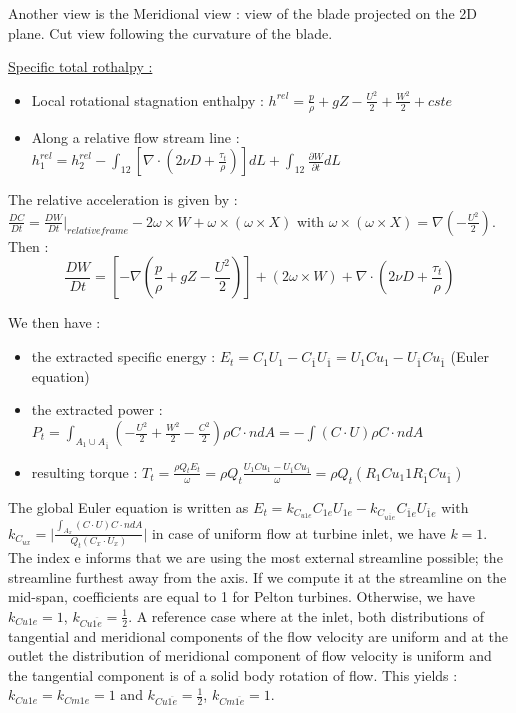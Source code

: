 \documentclass[../main.tex]{subfiles}
\begin{document}
Another view is the Meridional view : view of the blade projected on the 2D plane. Cut view following the curvature of the blade.

\quad \underline{Specific total rothalpy :}\\
\begin{itemize}
    \item Local rotational stagnation enthalpy : $h^{rel} = \frac{p}{\rho} + gZ - \frac{U^2}{2} + \frac{W^2}{2}+cste$
    \item Along a relative flow stream line : $h_1^{rel} = h_2^{rel} - \int_{12} [\nabla \cdot (2 \nu D + \frac{\tau_t}{\rho}) ]dL + \int_{12} \frac{\partial W}{\partial t}dL$
\end{itemize}

The relative acceleration is given by : $\frac{DC}{Dt} = \frac{DW}{Dt}\rvert_{relative frame} - 2\omega \times W + \omega \times (\omega \times X)$ with $\omega \times (\omega \times X) = \nabla (-\frac{U^2}{2})$. Then : \begin{equation}
    \frac{DW}{Dt} = [-\nabla (\frac{p}{\rho} + gZ - \frac{U^2}{2})] + (2\omega \times W) + \nabla \cdot (2\nu D + \frac{\tau_t}{\rho})
\end{equation}

We then have : \begin{itemize}
    \item the extracted specific energy : $E_t = C_1 U_1 - C_{\overline{1}} U_{\overline{1}} = U_1 Cu_1 - U_{\overline{1}} Cu_{\overline{1}}$ (Euler equation)
    \item the extracted power : $P_t = \int_{A_1 \cup A_{\overline{1}}} (-\frac{U^2}{2} + \frac{W^2}{2} - \frac{C^2}{2}) \rho C\cdot n dA = -\int (C\cdot U) \rho C\cdot n dA$
    \item resulting torque : $T_t = \frac{\rho Q_t E_t}{\omega} = \rho Q_t \frac{U_1 Cu_1 - U_{\overline{1}} Cu_{\overline{1}}}{\omega} = \rho Q_t (R_1 Cu_1 1 R_{\overline{1}} Cu_{\overline{1}})$
\end{itemize}

The global Euler equation is written as $E_t = k_{C_{u1e}} C_{1e} U_{1e} - k_{C_{u\overline{1}e}} C_{\overline{1}e} U_{\overline{1}e}$ with $k_{C_{ux}} = \lvert \frac{\int_{A_x} (C\cdot U) C \cdot n dA}{Q_t (C_x \cdot U_x)}\rvert$ in case of uniform flow at turbine inlet, we have $k = 1$. The index e informs that we are using the most external streamline possible; the streamline furthest away from the axis. If we compute it at the streamline on the mid-span, coefficients are equal to 1 for Pelton turbines. Otherwise, we have $k_{Cu1e} = 1$, $k_{Cu\overline{1e}} = \frac{1}{2}$. A reference case where at the inlet, both distributions of tangential and meridional components of the flow velocity are uniform and at the outlet the distribution of meridional component of flow velocity is uniform and the tangential component is of a solid body rotation of flow. This yields : $k_{Cu1e} = k_{Cm1e} = 1$ and $k_{Cu\overline{1e}} = \frac{1}{2}$, $k_{Cm\overline{1e}} = 1$.\\
\end{document}
